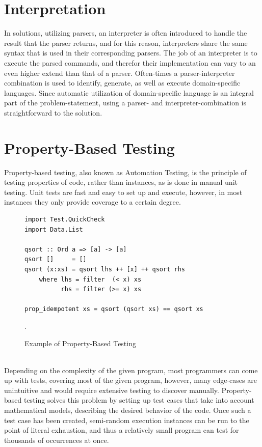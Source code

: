 \section{Interpretation}
In solutions, utilizing parsers, an interpreter is often introduced to handle the result that the parser returns, and for this reason, interpreters share the same syntax that is used in their corresponding parsers. The job of an interpreter is to execute the parsed commands, and therefor their implementation can vary to an even higher extend than that of a parser. Often-times a parser-interpreter combination is used to identify, generate, as well as execute domain-specific languages. Since automatic utilization of domain-specific language is an integral part of the problem-statement, using a parser- and interpreter-combination is straightforward to the solution.

\section{Property-Based Testing}

Property-based testing, also known as Automation Testing, is the principle of testing properties of code, rather than instances, as is done in manual unit testing. Unit tests are fast and easy to set up and execute, however, in most instances they only provide coverage to a certain degree.

\begin{figure}[h]
  \centering
  \begin{lstlisting}
import Test.QuickCheck
import Data.List

qsort :: Ord a => [a] -> [a]
qsort []     = []
qsort (x:xs) = qsort lhs ++ [x] ++ qsort rhs
    where lhs = filter  (< x) xs
          rhs = filter (>= x) xs

prop_idempotent xs = qsort (qsort xs) == qsort xs
  \end{lstlisting}
  \caption{Example of Property-Based Testing~\cite{realWorldHaskell11}}.
  \label{fig:pbtEx}
\end{figure}\ \\

\noindent
Depending on the complexity of the given program, most programmers can come up with tests, covering most of the given program, however, many edge-cases are unintuitive and would require extensive testing to discover manually. Property-based testing solves this problem by setting up test cases that take into account mathematical models, describing the desired behavior of the code. Once such a test case has been created, semi-random execution instances can be run to the point of literal exhaustion, and thus a relatively small program can test for thousands of occurrences at once.


